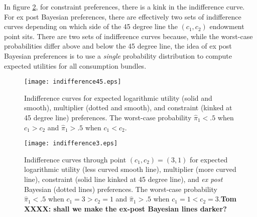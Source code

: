 In figure  \ref{fig_indiff_certequiv},  for  constraint preferences, there is a kink in the indifference curve.
For ex post Bayesian preferences,  there are effectively two sets of indifference curves  depending on which side of the
45 degree line the $(c_1, c_2)$ endowment point sits.  There are two sets of indifference curves  because, while the worst-case probabilities differ above
and below the 45 degree line, the idea of ex post Bayesian preferences is to use a {\em single} probability distribution to compute
expected utilities for all consumption bundles.







 \begin{figure}[htp]
\centering
\texttt{[image: indifference45.eps]}
\caption[Expected  utility, multiplier, and constraint preferences]{Indifference curves for expected logarithmic utility (solid and smooth), multiplier (dotted and smooth), and constraint (kinked at 45 degree line) preferences.
The worst-case probability $\hat \pi_1 < .5$ when $c_1 > c_2$ and $\hat \pi_1 > .5$ when $c_1 < c_2$.}\label{fig_indiff45}
\end{figure}

%



\begin{figure}[htp]
\centering
\texttt{[image: indifference3.eps]}
\caption[Indifference curves through point $(c_1, c_2) = (3,1)$]{Indifference curves through point $(c_1, c_2) = (3,1)$ %
 for expected logarithmic utility (less curved smooth line),  multiplier (more curved line),  constraint (solid line kinked at 45 degree line),
and \textit{ex post} Bayesian (dotted lines) preferences.
The worst-case probability $\hat \pi_1 < .5$  when  $c_1 =3 > c_2 =1$ and $\hat \pi_1 > .5$ when $c_1=1 < c_2 = 3$.\textbf{Tom XXXX: shall we make the ex-post Bayesian lines darker?}}\label{fig_indiff_certequiv}
\end{figure}








